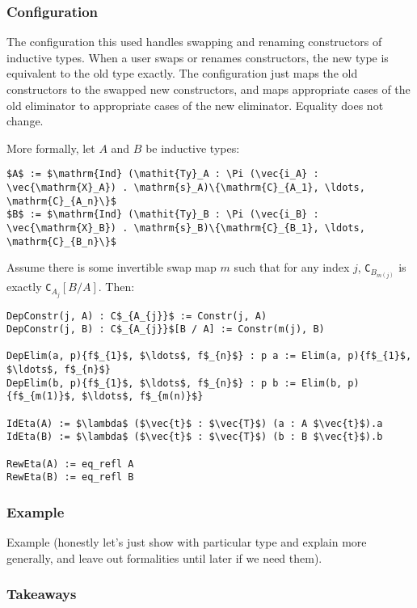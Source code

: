 \subsubsection{Configuration}
The configuration this used handles swapping and renaming constructors of inductive types.
When a user swaps or renames constructors, the new type is equivalent to the old type exactly.
The configuration just maps the old constructors to the swapped new constructors, and maps appropriate
cases of the old eliminator to appropriate cases of the new eliminator.
Equality does not change.

More formally, let $A$ and $B$ be inductive types:

\begin{lstlisting}
$A$ := $\mathrm{Ind} (\mathit{Ty}_A : \Pi (\vec{i_A} : \vec{\mathrm{X}_A}) . \mathrm{s}_A)\{\mathrm{C}_{A_1}, \ldots, \mathrm{C}_{A_n}\}$
$B$ := $\mathrm{Ind} (\mathit{Ty}_B : \Pi (\vec{i_B} : \vec{\mathrm{X}_B}) . \mathrm{s}_B)\{\mathrm{C}_{B_1}, \ldots, \mathrm{C}_{B_n}\}$
\end{lstlisting}		
Assume there is some invertible swap map $m$ such that for any index $j$,
\lstinline{C}$_{B_{m(j)}}$ is exactly \lstinline{C}$_{A_j}[B / A]$.
Then:

\begin{lstlisting}
DepConstr(j, A) : C$_{A_{j}}$ := Constr(j, A) 
DepConstr(j, B) : C$_{A_{j}}$[B / A] := Constr(m(j), B)

DepElim(a, p){f$_{1}$, $\ldots$, f$_{n}$} : p a := Elim(a, p){f$_{1}$, $\ldots$, f$_{n}$}
DepElim(b, p){f$_{1}$, $\ldots$, f$_{n}$} : p b := Elim(b, p){f$_{m(1)}$, $\ldots$, f$_{m(n)}$}

IdEta(A) := $\lambda$ ($\vec{t}$ : $\vec{T}$) (a : A $\vec{t}$).a
IdEta(B) := $\lambda$ ($\vec{t}$ : $\vec{T}$) (b : B $\vec{t}$).b

RewEta(A) := eq_refl A
RewEta(B) := eq_refl B
\end{lstlisting}

\subsubsection{Example}

Example (honestly let's just show with particular type and explain more generally, and leave out formalities until later if we need them).

\subsubsection{Takeaways}

